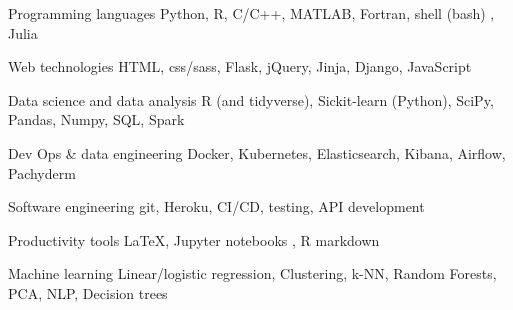 


\begin{cvskills}


\cvskill
{Programming languages} %
{Python,  R, C/C++, MATLAB, Fortran, shell (bash) , Julia} %


\cvskill
{Web technologies} %
{HTML, css/sass, Flask, jQuery, Jinja, Django, JavaScript } %


\cvskill
{Data science and data analysis} %
{ R (and tidyverse), Sickit-learn (Python), SciPy, Pandas, Numpy, SQL, Spark} %




\cvskill
{Dev Ops \& data engineering } %
{Docker, Kubernetes, Elasticsearch, Kibana, Airflow, Pachyderm} %



\cvskill
{Software engineering } %
{git, Heroku, CI/CD, testing, API development} %


\cvskill
{Productivity tools } %
{LaTeX, Jupyter notebooks , R markdown} %


\cvskill
{Machine learning} %
{Linear/logistic regression, Clustering, k-NN, Random Forests, PCA, NLP, Decision trees}
%


\end{cvskills}
